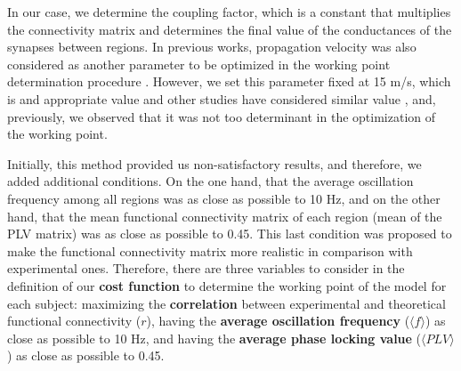 \documentclass[../main.tex]{subfiles}
\begin{document}
In our case, we determine the coupling factor, which is a constant that multiplies the connectivity matrix and determines the final value of the conductances of the synapses between regions.
In previous works, propagation velocity was also considered as another parameter to be optimized in the working point determination procedure \citep{cabral_role_2011,nakagawa_how_2014}.
However, we set this parameter fixed at 15 m/s, which is and appropriate value and other studies have considered similar value \citep{cabrera-alvarez_modeling_2023}, and, previously, we observed that it was not too determinant in the optimization of the working point.

Initially, this method provided us non-satisfactory results, and therefore, we added additional conditions.
On the one hand, that the average oscillation frequency among all regions was as close as possible to 10 Hz, and on the other hand, that the mean functional connectivity matrix of each region (mean of the PLV matrix) was as close as possible to 0.45.
This last condition was proposed to make the functional connectivity matrix more realistic in comparison with experimental ones.
Therefore, there are three variables to consider in the definition of our \textbf{cost function} to determine the working point of the model for each subject: maximizing the \textbf{correlation} between experimental and theoretical functional connectivity ($r$), having the \textbf{average oscillation frequency} ($\langle f \rangle$) as close as possible to 10 Hz, and having the \textbf{average phase locking value} ($\langle PLV \rangle$) as close as possible to 0.45.
\end{document}
